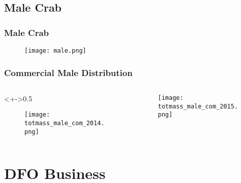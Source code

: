 
\subsection{Male Crab}

\begin{frame}

\frametitle{Male Crab}
\begin{figure}

 \vspace*{-0.4cm}
 \centerline{\texttt{[image: male.png]}}

 \end{figure}
\end{frame}




\begin{frame}
\frametitle{Commercial Male Distribution}

\begin{columns}
\begin{column}<+->{0.5\textwidth}
 \vspace*{-0.5cm}
\begin{figure}
\centerline{\texttt{[image: totmass\_male\_com\_2014.png]}}

\end{figure}
\end{column}

\begin{column}{0.5\textwidth}
\begin{figure}
 \vspace*{-0.5cm}

\centerline{\texttt{[image: totmass\_male\_com\_2015.png]}}

 \end{figure}

\end{column}
\end{columns}


\end{frame}


\section{DFO Business}
